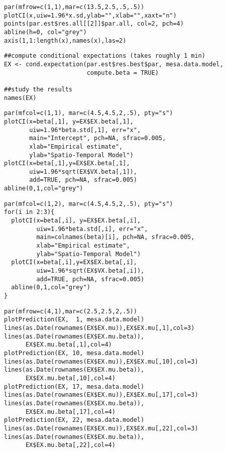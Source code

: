 %
\vspace*{-1\baselineskip}
\begin{verbatim}
par(mfrow=c(1,1),mar=c(13.5,2.5,.5,.5))
plotCI(x,uiw=1.96*x.sd,ylab="",xlab="",xaxt="n")
points(par.est$res.all[[2]]$par.all, col=2, pch=4)
abline(h=0, col="grey")
axis(1,1:length(x),names(x),las=2)
\end{verbatim}
\begin{verbatim}
##compute conditional expectations (takes roughly 1 min)
EX <- cond.expectation(par.est$res.best$par, mesa.data.model,
                       compute.beta = TRUE)

##study the results
names(EX)
\end{verbatim}
%
\vspace*{-1\baselineskip}
\begin{verbatim}
par(mfcol=c(1,1), mar=c(4.5,4.5,2,.5), pty="s")
plotCI(x=beta[,1], y=EX$EX.beta[,1],
       uiw=1.96*beta.std[,1], err="x",
       main="Intercept", pch=NA, sfrac=0.005,
       xlab="Empirical estimate",
       ylab="Spatio-Temporal Model")
plotCI(x=beta[,1],y=EX$EX.beta[,1],
       uiw=1.96*sqrt(EX$VX.beta[,1]),
       add=TRUE, pch=NA, sfrac=0.005)
abline(0,1,col="grey")
\end{verbatim}
%
\vspace*{-1\baselineskip}
\begin{verbatim}
par(mfcol=c(1,2), mar=c(4.5,4.5,2,.5), pty="s")
for(i in 2:3){
  plotCI(x=beta[,i], y=EX$EX.beta[,i],
         uiw=1.96*beta.std[,i], err="x",
         main=colnames(beta)[i], pch=NA, sfrac=0.005,
         xlab="Empirical estimate",
         ylab="Spatio-Temporal Model")
  plotCI(x=beta[,i],y=EX$EX.beta[,i],
         uiw=1.96*sqrt(EX$VX.beta[,i]),
         add=TRUE, pch=NA, sfrac=0.005)
  abline(0,1,col="grey")
}
\end{verbatim}
%
\vspace*{-1\baselineskip}
\begin{verbatim}
par(mfrow=c(4,1),mar=c(2.5,2.5,2,.5))
plotPrediction(EX,  1, mesa.data.model)
lines(as.Date(rownames(EX$EX.mu)),EX$EX.mu[,1],col=3)
lines(as.Date(rownames(EX$EX.mu.beta)),
      EX$EX.mu.beta[,1],col=4)
plotPrediction(EX, 10, mesa.data.model)
lines(as.Date(rownames(EX$EX.mu)),EX$EX.mu[,10],col=3)
lines(as.Date(rownames(EX$EX.mu.beta)),
      EX$EX.mu.beta[,10],col=4)
plotPrediction(EX, 17, mesa.data.model)
lines(as.Date(rownames(EX$EX.mu)),EX$EX.mu[,17],col=3)
lines(as.Date(rownames(EX$EX.mu.beta)),
      EX$EX.mu.beta[,17],col=4)
plotPrediction(EX, 22, mesa.data.model)
lines(as.Date(rownames(EX$EX.mu)),EX$EX.mu[,22],col=3)
lines(as.Date(rownames(EX$EX.mu.beta)),
      EX$EX.mu.beta[,22],col=4)
\end{verbatim}
